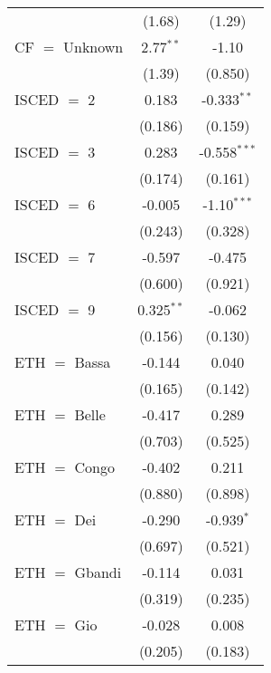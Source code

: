 \begin{table}[htbp!]
\begin{adjustbox}{width = 1\textwidth, max height = 0.95\textheight, center}
\begin{threeparttable}[b]
\begin{tabular}{lcc}
                                 & (1.68)         & (1.29)\\   
            CF $=$ Unknown       & 2.77$^{**}$    & -1.10\\   
                                 & (1.39)         & (0.850)\\   
            ISCED $=$ 2          & 0.183          & -0.333$^{**}$\\   
                                 & (0.186)        & (0.159)\\   
            ISCED $=$ 3          & 0.283          & -0.558$^{***}$\\   
                                 & (0.174)        & (0.161)\\   
            ISCED $=$ 6          & -0.005         & -1.10$^{***}$\\   
                                 & (0.243)        & (0.328)\\   
            ISCED $=$ 7          & -0.597         & -0.475\\   
                                 & (0.600)        & (0.921)\\   
            ISCED $=$ 9          & 0.325$^{**}$   & -0.062\\   
                                 & (0.156)        & (0.130)\\   
            ETH $=$ Bassa        & -0.144         & 0.040\\   
                                 & (0.165)        & (0.142)\\   
            ETH $=$ Belle        & -0.417         & 0.289\\   
                                 & (0.703)        & (0.525)\\   
            ETH $=$ Congo        & -0.402         & 0.211\\   
                                 & (0.880)        & (0.898)\\   
            ETH $=$ Dei          & -0.290         & -0.939$^{*}$\\   
                                 & (0.697)        & (0.521)\\   
            ETH $=$ Gbandi       & -0.114         & 0.031\\   
                                 & (0.319)        & (0.235)\\   
            ETH $=$ Gio          & -0.028         & 0.008\\   
                                 & (0.205)        & (0.183)\\   

\end{tabular}
\end{threeparttable}
\end{adjustbox}
\end{table}
